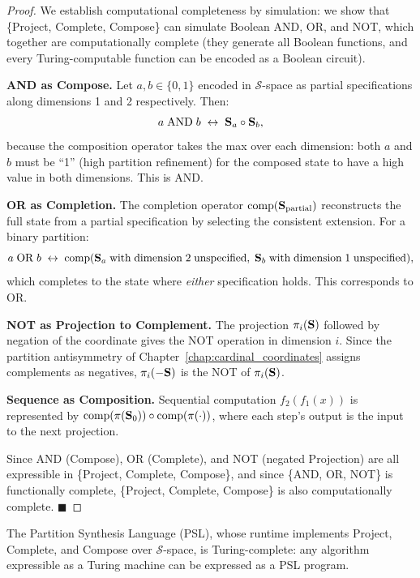 \begin{proof}
We establish computational completeness by simulation: we show that
\{Project, Complete, Compose\} can simulate Boolean AND, OR, and NOT,
which together are computationally complete (they generate all Boolean
functions, and every Turing-computable function can be encoded as a
Boolean circuit).

\textbf{AND as Compose.}
Let $a, b \in \{0,1\}$ encoded in $\mathcal{S}$-space as partial
specifications along dimensions 1 and 2 respectively. Then:
\begin{equation}
  a \;\mathrm{AND}\; b \;\leftrightarrow\;
  \mathbf{S}_a \circ \mathbf{S}_b,
\end{equation}
because the composition operator takes the max over each dimension:
both $a$ and $b$ must be ``1'' (high partition refinement) for the
composed state to have a high value in both dimensions. This is AND.

\textbf{OR as Completion.}
The completion operator $\mathrm{comp}(\mathbf{S}_{\mathrm{partial}})$
reconstructs the full state from a partial specification by selecting
the consistent extension. For a binary partition:
\begin{equation}
  a \;\mathrm{OR}\; b \;\leftrightarrow\;
  \mathrm{comp}(\mathbf{S}_a \;\mathrm{with\; dimension\; 2\; unspecified},
               \;\mathbf{S}_b \;\mathrm{with\; dimension\; 1\; unspecified}),
\end{equation}
which completes to the state where \emph{either} specification holds.
This corresponds to OR.

\textbf{NOT as Projection to Complement.}
The projection $\pi_i(\mathbf{S})$ followed by negation of the coordinate
gives the NOT operation in dimension $i$. Since the partition antisymmetry
of Chapter~\ref{chap:cardinal_coordinates} assigns complements as
negatives, $\pi_i(-\mathbf{S})$ is the NOT of $\pi_i(\mathbf{S})$.

\textbf{Sequence as Composition.}
Sequential computation $f_2(f_1(x))$ is represented by
$\mathrm{comp}(\pi(\mathbf{S}_0)) \circ \mathrm{comp}(\pi(\cdot))$,
where each step's output is the input to the next projection.

Since AND (Compose), OR (Complete), and NOT (negated Projection) are
all expressible in \{Project, Complete, Compose\}, and since \{AND, OR, NOT\}
is functionally complete, \{Project, Complete, Compose\} is also
computationally complete. $\blacksquare$
\end{proof}

\begin{corollary}
\label{cor:turing_complete}
The Partition Synthesis Language (PSL), whose runtime implements Project,
Complete, and Compose over $\mathcal{S}$-space, is Turing-complete:
any algorithm expressible as a Turing machine can be expressed as
a PSL program.
\end{corollary}

